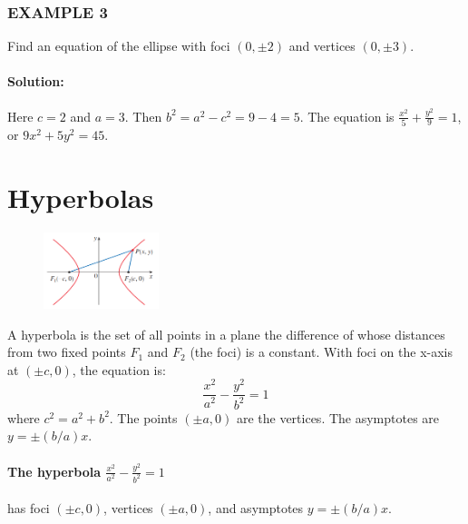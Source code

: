 \documentclass{article}
\begin{document}
\subsubsection*{EXAMPLE 3}
Find an equation of the ellipse with foci $(0, \pm2)$ and vertices $(0, \pm3)$.

\paragraph{Solution:}
Here $c=2$ and $a=3$. Then $b^2 = a^2 - c^2 = 9 - 4 = 5$. The equation is $\frac{x^2}{5} + \frac{y^2}{9} = 1$, or $9x^2 + 5y^2 = 45$.

\section*{Hyperbolas}
\begin{figure}[htbp]
    \centering
    \includegraphics[width=0.3\textwidth]{graph56.png}
\end{figure}
A hyperbola is the set of all points in a plane the difference of whose distances from two fixed points $F_1$ and $F_2$ (the foci) is a constant. With foci on the x-axis at $(\pm c, 0)$, the equation is:
\[
\frac{x^2}{a^2} - \frac{y^2}{b^2} = 1
\]
where $c^2 = a^2 + b^2$. The points $(\pm a,0)$ are the vertices. The asymptotes are $y = \pm(b/a)x$.

\paragraph{The hyperbola $\frac{x^2}{a^2} - \frac{y^2}{b^2} = 1$} has foci $(\pm c, 0)$, vertices $(\pm a, 0)$, and asymptotes $y = \pm(b/a)x$.
\end{document}
